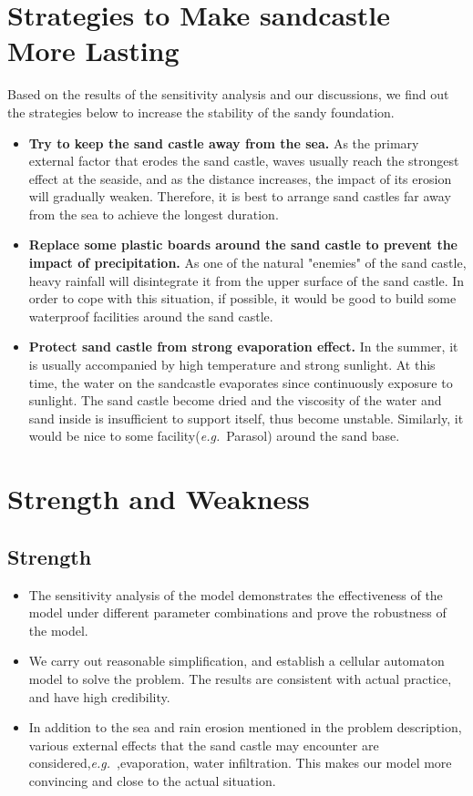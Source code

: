 \documentclass{mcmthesis}		    %
\def\eg{\mbox{\textit{e.g.}}}
\begin{document}
	\section{Strategies to Make sandcastle More Lasting}
	Based on the results of the sensitivity analysis and our discussions, we find out the strategies below to increase the stability of the sandy foundation.
	\begin{itemize}
	    \item \textbf{Try to keep the sand castle away from the sea.} As the primary external factor that erodes the sand castle, waves usually reach the strongest effect at the seaside, and as the distance increases, the impact of its erosion will gradually weaken. Therefore, it is best to arrange sand castles far away from the sea to achieve the longest duration. 
	    \item \textbf{Replace some plastic boards around the sand castle to prevent the impact of precipitation.} As one of the natural "enemies" of the sand castle, heavy rainfall will disintegrate it from the upper surface of the sand castle. In order to cope with this situation, if possible, it would be good to build some waterproof facilities around the sand castle. 
	    \item \textbf{Protect sand castle from strong evaporation effect.} In the summer, it is usually accompanied by high temperature and strong sunlight. At this time, the water on the sandcastle evaporates since continuously exposure to sunlight. The sand castle become dried and the viscosity of the water and sand inside is insufficient to support itself, thus become unstable. Similarly, it would be nice to some facility(\eg~Parasol) around the sand base.
	\end{itemize}
	\section{Strength and Weakness}
	\subsection{Strength}
    \begin{itemize}
        \item The sensitivity analysis of the model demonstrates the effectiveness of the model under different parameter combinations and prove the robustness of the model.
        \item We carry out reasonable simplification, and establish a cellular automaton model to solve the problem. The results are consistent with actual practice, and have high credibility.
        \item In addition to the sea and rain erosion mentioned in the problem description, various external effects that the sand castle may encounter are considered,\eg~,evaporation, water infiltration. This makes our model more convincing and close to the actual situation.
        
    \end{itemize}
    
\end{document}
